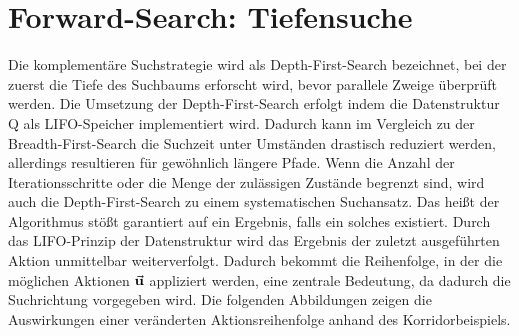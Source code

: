 \section{Forward-Search: Tiefensuche}
Die komplementäre Suchstrategie wird als Depth-First-Search bezeichnet, bei der zuerst die Tiefe des Suchbaums erforscht wird, bevor parallele Zweige überprüft werden. Die Umsetzung der Depth-First-Search erfolgt indem die Datenstruktur Q als LIFO-Speicher implementiert wird. Dadurch kann im Vergleich zu der Breadth-First-Search die Suchzeit unter Umständen drastisch reduziert werden, allerdings resultieren für gewöhnlich längere Pfade. Wenn die Anzahl der Iterationsschritte oder die Menge der zulässigen Zustände begrenzt sind, wird auch die Depth-First-Search zu einem systematischen Suchansatz. Das heißt der Algorithmus stößt garantiert auf ein Ergebnis, falls ein solches existiert. Durch das LIFO-Prinzip der Datenstruktur wird das Ergebnis der zuletzt ausgeführten Aktion unmittelbar weiterverfolgt. Dadurch bekommt die Reihenfolge, in der die möglichen Aktionen $\vec{\mathbf{u}}$ appliziert werden, eine zentrale Bedeutung, da dadurch die Suchrichtung vorgegeben wird. Die folgenden Abbildungen zeigen die Auswirkungen einer veränderten Aktionsreihenfolge anhand des Korridorbeispiels.

